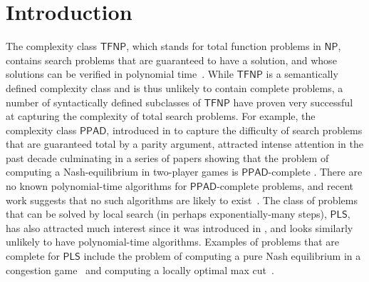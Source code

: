\documentclass[a4paper,UKenglish]{lipics2}
\theoremstyle{definition}
\def\cc#1{\mathsf{#1}}
\def\CLS{\ensuremath{\cc{CLS}}\xspace}
\def\NP{\ensuremath{\cc{NP}}\xspace}
\def\TFNP{\ensuremath{\cc{TFNP}}\xspace}
\def\PPAD{\ensuremath{\cc{PPAD}}\xspace}
\def\PLS{\ensuremath{\cc{PLS}}\xspace}
\def\problem#1{\textsc{#1}}
\def\CM{\problem{Contraction}\xspace}
\def\MMCM{\problem{MetametricContraction}\xspace}
\def\EOPL{\problem{EndOfPotentialLine}\xspace}
\def\EOML{\problem{EndOfMeteredLine}\xspace}
\def\PLCP{\problem{P-LCP}\xspace}
\begin{document}
\begin{abstract}
%
%
\end{abstract}


\section{Introduction}

The complexity class \TFNP, which stands for total function problems in
\NP, contains search problems that are guaranteed to have a solution, and whose
solutions can be verified in polynomial time~\cite{megiddo1991total}.
%
While \TFNP is a semantically defined complexity class and is thus unlikely to
contain complete problems, a number of syntactically defined subclasses of
\TFNP have proven very successful at capturing the complexity of total search 
problems.
For example, the complexity class $\cc{PPAD}$, introduced in
\cite{papadimitriou1994complexity} to capture the difficulty of search problems
that are guaranteed total by a parity argument, attracted intense attention in
the past decade culminating in a series of papers showing that the problem of
computing a Nash-equilibrium in two-player games is $\cc{PPAD}$-complete
\cite{chen2009settling,daskalakis2009complexity}. There are no known
polynomial-time algorithms for $\cc{PPAD}$-complete problems, and recent work
suggests that no such algorithms are likely to exist~\cite{bitansky2015cryptographic,garg2016revisiting}. 
The class of problems that
can be solved by local search (in perhaps exponentially-many steps), $\cc{PLS}$,
has also attracted much interest since it was introduced in
\cite{johnson1988easy}, and looks similarly unlikely to have polynomial-time
algorithms. Examples of problems that are complete for \PLS include the problem
of computing a pure Nash equilibrium in a congestion
game~\cite{fabrikant2004complexity} and computing a locally optimal max
cut~\cite{schaffer1991simple}.
\end{document}
